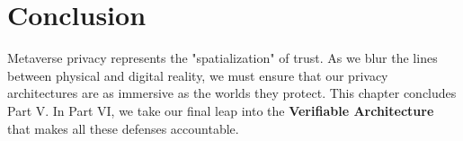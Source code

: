 \section{Conclusion}
\label{sec:conclusion_metaverse}

Metaverse privacy represents the "spatialization" of trust. As we blur the lines between physical and digital reality, we must ensure that our privacy architectures are as immersive as the worlds they protect. This chapter concludes Part V. In Part VI, we take our final leap into the \textbf{Verifiable Architecture} that makes all these defenses accountable.


